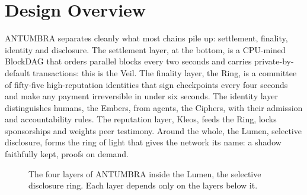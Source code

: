 \section{Design Overview}\label{sec:overview}

ANTUMBRA separates cleanly what most chains pile up: settlement, finality,
identity and disclosure. The settlement layer, at the bottom, is a
CPU-mined BlockDAG that orders parallel blocks every two seconds and
carries private-by-default transactions: this is the Veil. The finality
layer, the Ring, is a committee of fifty-five high-reputation identities
that sign checkpoints every four seconds and make any payment irreversible
in under six seconds. The identity layer distinguishes humans, the Embers,
from agents, the Ciphers, with their admission and accountability rules.
The reputation layer, Kleos, feeds the Ring, locks sponsorships and weights
peer testimony. Around the whole, the Lumen, selective disclosure, forms
the ring of light that gives the network its name: a shadow faithfully
kept, proofs on demand.

\begin{figure}[htbp]
\centering
{}
\caption{The four layers of ANTUMBRA inside the Lumen, the selective
disclosure ring. Each layer depends only on the layers below it.}
\label{fig:arch}
\end{figure}


